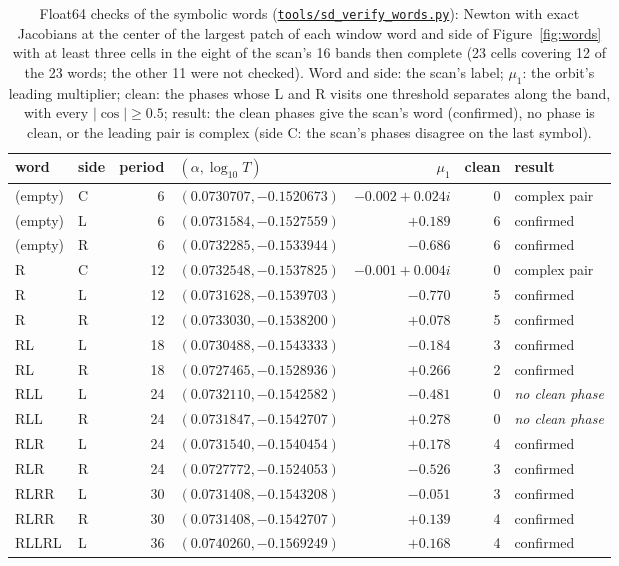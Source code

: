 \documentclass[11pt,letterpaper]{article}
\newcommand{\repourl}{https://github.com/tdj28/neural-shrimp}
\newcommand{\reporef}{arxiv-v1}
\newcommand{\repo}[1]{\href{\repourl/blob/\reporef/#1}{\nolinkurl{#1}}}
\begin{document}
\begin{table}[tbp]
\centering
\caption{Float64 checks of the symbolic words (\repo{tools/sd_verify_words.py}): Newton with exact Jacobians at the
center of the largest patch of each window word and side of Figure~\ref{fig:words} with at least three cells in the
eight of the scan's 16 bands then complete (23 cells covering 12 of the 23 words; the other 11 were not checked). Word and
side: the scan's label; $\mu_1$: the orbit's leading multiplier; clean: the phases whose L and R visits one threshold
separates along the band, with every $|\cos|\ge0.5$; result: the clean phases give the scan's word (confirmed), no
phase is clean, or the leading pair is complex (side C: the scan's phases disagree on the last symbol).}
\label{tab:p6words}
\footnotesize
\begin{tabular}{llrlrrl}
\toprule
word & side & period & $(\alpha,\log_{10}T)$ & $\mu_1$ & clean & result \\
\midrule
(empty) & C & 6 & $(0.0730707, -0.1520673)$ & $-0.002+0.024i$ & 0 & complex pair \\
(empty) & L & 6 & $(0.0731584, -0.1527559)$ & $+0.189$ & 6 & confirmed \\
(empty) & R & 6 & $(0.0732285, -0.1533944)$ & $-0.686$ & 6 & confirmed \\
R & C & 12 & $(0.0732548, -0.1537825)$ & $-0.001+0.004i$ & 0 & complex pair \\
R & L & 12 & $(0.0731628, -0.1539703)$ & $-0.770$ & 5 & confirmed \\
R & R & 12 & $(0.0733030, -0.1538200)$ & $+0.078$ & 5 & confirmed \\
RL & L & 18 & $(0.0730488, -0.1543333)$ & $-0.184$ & 3 & confirmed \\
RL & R & 18 & $(0.0727465, -0.1528936)$ & $+0.266$ & 2 & confirmed \\
RLL & L & 24 & $(0.0732110, -0.1542582)$ & $-0.481$ & 0 & \emph{no clean phase} \\
RLL & R & 24 & $(0.0731847, -0.1542707)$ & $+0.278$ & 0 & \emph{no clean phase} \\
RLR & L & 24 & $(0.0731540, -0.1540454)$ & $+0.178$ & 4 & confirmed \\
RLR & R & 24 & $(0.0727772, -0.1524053)$ & $-0.526$ & 3 & confirmed \\
RLRR & L & 30 & $(0.0731408, -0.1543208)$ & $-0.051$ & 3 & confirmed \\
RLRR & R & 30 & $(0.0731408, -0.1542707)$ & $+0.139$ & 4 & confirmed \\
RLLRL & L & 36 & $(0.0740260, -0.1569249)$ & $+0.168$ & 4 & confirmed \\

\end{tabular}
\end{table}
\end{document}
